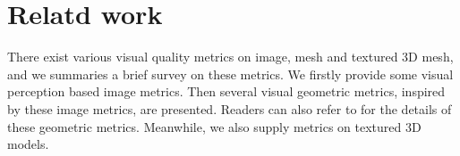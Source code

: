 \section{Relatd work}
There exist various visual quality metrics on image, mesh and textured 3D mesh, and we summaries a brief survey on these metrics. We firstly provide some visual perception based image metrics. Then several visual geometric metrics, inspired by these image metrics, are presented. Readers can also refer to \cite{Corsini_2013} for the details of these geometric metrics.  Meanwhile, we also supply metrics on textured 3D models.  
